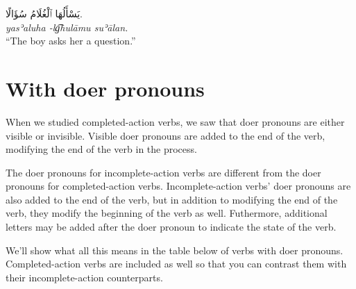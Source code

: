 \documentclass[
  10pt,
]{book}
\begin{document}
\foreignlanguage{arabic}{يَسْأَلُهَا ٱلْغُلَامُ سُؤَالًا.}\\
\emph{yasʾaluha -lg͡hulāmu suʾālan.}\\
\enquote{The boy asks her a question.}

\section{With doer pronouns}\label{with-doer-pronouns}

When we studied completed-action verbs, we saw that doer pronouns are either visible or invisible. Visible doer pronouns are added to the end of the verb, modifying the end of the verb in the process.

The doer pronouns for incomplete-action verbs are different from the doer pronouns for completed-action verbs.
Incomplete-action verbs' doer pronouns are also added to the end of the verb, but in addition to modifying the end of the verb, they modify the beginning of the verb as well. Futhermore, additional letters may be added after the doer pronoun to indicate the state of the verb.

We'll show what all this means in the table below of verbs with doer pronouns. Completed-action verbs are included as well so that you can contrast them with their incomplete-action counterparts.
\end{document}
